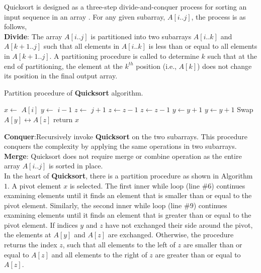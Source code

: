 Quicksort is designed as a three-step divide-and-conquer process for sorting an input sequence in an array \cite{cormen}. For any given subarray, $A[i..j]$, the process is as follows,\\
\textbf{Divide}: The array $A[i..j]$ is partitioned into two subarrays $A[i..k]$ and $A[k + 1..j]$ such that all elements in $A[i..k]$ is less than or equal to all elements in $A[k + 1..j]$. A partitioning procedure is called to determine $k$ such that at the end of partitioning, the element at the $k^{th}$ position (i.e., $A[k]$) does not change its position in the final output array.
\begin{algorithm}
  \caption{Partition procedure of \textbf{Quicksort} algorithm.}
  \label{algo:ins_sort1}
  \begin{algorithmic}[1]
     \newline
     \newline
      \State $x \leftarrow$ $A[i]$
      \State $y \leftarrow$ $i-1$
      \State $z \leftarrow$ $j+1$
          \State $z \leftarrow z-1$
            \State $z \leftarrow z-1$
          \EndWhile
          \State $y \leftarrow y+1$
            \State $y \leftarrow y+1$ 
          \EndWhile
            \State Swap $A[y] \leftrightarrow A[z]$
            \Else
            \State return $x$
          \EndIf
      \EndWhile
     \EndProcedure 
  \end{algorithmic}
\end{algorithm}
\textbf{Conquer}:Recursively invoke \textbf{Quicksort} on the two subarrays. This procedure conquers the complexity by applying the same operations in two subarrays.\\
\textbf{Merge}: Quicksort does not require merge or combine operation as the entire array $A[i..j]$ is sorted in place.\\
\indent In the heart of \textbf{Quicksort}, there is a partition procedure as shown in Algorithm $1$. A pivot element $x$ is selected. The first inner while loop (line \#$6$) continues examining elements until it finds an element that is smaller than or equal to the pivot element. Similarly, the second inner while loop (line \#$9$) continues examining elements until it finds an element that is greater than or equal to the pivot element. If indices $y$ and $z$ have not exchanged their side around the pivot, the elements at $A[y]$ and $A[z]$ are exchanged. Otherwise, the procedure returns the index $z$, such that all elements to the left of $z$ are smaller than or equal to $A[z]$ and all elements to the right of $z$ are greater than or equal to $A[z]$.\\

